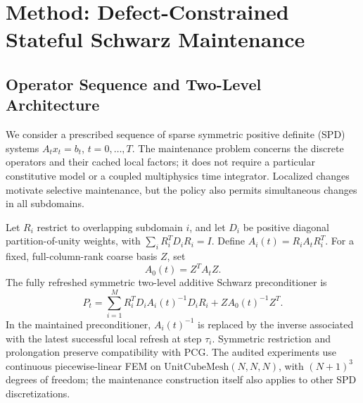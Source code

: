 \section{Method: Defect-Constrained Stateful Schwarz Maintenance}
\label{sec:method}

\subsection{Operator Sequence and Two-Level Architecture}
We consider a prescribed sequence of sparse symmetric positive definite (SPD)
systems $A_t x_t=b_t$, $t=0,\ldots,T$. The maintenance problem concerns the
discrete operators and their cached local factors; it does not require a
particular constitutive model or a coupled multiphysics time integrator.
Localized changes motivate selective maintenance, but the policy also permits
simultaneous changes in all subdomains.

Let $R_i$ restrict to overlapping subdomain $i$, and let $D_i$ be positive
diagonal partition-of-unity weights, with
$\sum_i R_i^T D_i R_i=I$. Define $A_i(t)=R_i A_t R_i^T$.
For a fixed, full-column-rank coarse basis $Z$, set
\begin{equation}
A_0(t)=Z^T A_t Z.
\label{eq:dc_coarse_operator}
\end{equation}
The fully refreshed symmetric two-level additive Schwarz preconditioner is
\begin{equation}
P_t=\sum_{i=1}^M R_i^T D_i A_i(t)^{-1}D_i R_i
       +Z A_0(t)^{-1}Z^T.
\label{eq:two_level_prec}
\end{equation}
In the maintained preconditioner, $A_i(t)^{-1}$ is replaced by the inverse
associated with the latest successful local refresh at step $\tau_i$.
Symmetric restriction and prolongation preserve compatibility with PCG.
The audited experiments use continuous piecewise-linear FEM on
$\mathrm{UnitCubeMesh}(N,N,N)$, with $(N+1)^3$ degrees of freedom;
the maintenance construction itself also applies to other SPD discretizations.

